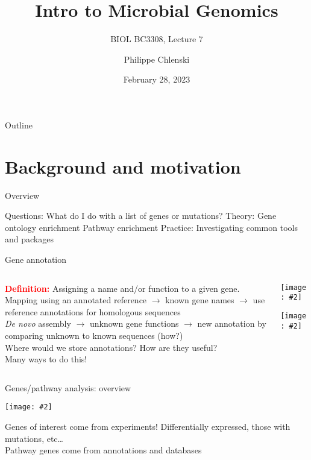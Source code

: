 \documentclass{beamer}
\title{Intro to Microbial Genomics}
\subtitle{BIOL BC3308, Lecture 7}
\author{Philippe Chlenski}
\date{February 28, 2023}
\renewcommand{\c}[1]{\begin{center}#1\end{center}}
\newcommand{\red}[1]{\textcolor{red}{\textbf{#1}}}
\newcommand{\gr}[2][.95]{\c{\texttt{[image: \#2]}}}
\begin{document}
\begin{frame}[plain]
\titlepage
\end{frame}

\begin{frame}{Outline}
\tableofcontents
\end{frame}

\section{Background and motivation}

\begin{frame}{Overview}
    \begin{outline}
        \1[] Questions:
            \2 What do I do with a list of genes or mutations?
        \1[] Theory:
            \2 Gene ontology enrichment
            \2 Pathway enrichment
        \1[] Practice:
            \2 Investigating common tools and packages
    \end{outline}
\end{frame}

\begin{frame}{Gene annotation}
    \begin{columns}
        \begin{column}{0.7\textwidth}
            \red{Definition:} Assigning a name and/or function to a given gene.\\
            \bigskip
            Mapping using an annotated reference $\to$ known gene names $\to$ use reference annotations for homologous sequences\\
            \bigskip
            \textit{De novo} assembly $\to$ unknown gene functions $\to$ new annotation by comparing unknown to known sequences (how?)\\
            \bigskip
            Where would we store annotations? How are they useful?\\
            \bigskip
            Many ways to do this!
        \end{column}
        \begin{column}{0.3\textwidth}
            \gr{l7_figs/s3_file.png}
            \gr{l7_figs/s3_gene.png}
        \end{column}
    \end{columns}
\end{frame}

\begin{frame}{Genes/pathway analysis: overview}
    \gr{l7_figs/s4_enrichment.png}
    Genes of interest come from experiments! Differentially expressed, those with mutations, etc\ldots\\
    \bigskip
    Pathway genes come from annotations and databases
\end{frame}
\end{document}
